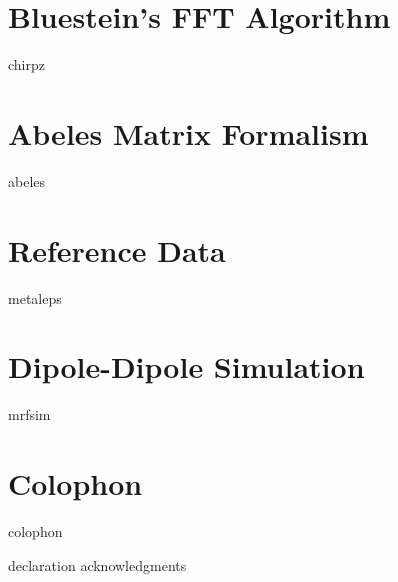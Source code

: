 \documentclass[12pt,a4paper,titlepage,onecolumn]{report}
\begin{document}
\section{Bluestein's FFT Algorithm}
{chirpz}
\section{Abeles Matrix Formalism}\label{ch:abeles}
{abeles}
\section{Reference Data}\label{ch:reference}
{metaleps}
\section{Dipole-Dipole Simulation}\label{sec:mrfsim}
{mrfsim}
\section{Colophon}
{colophon}




{declaration}
{acknowledgments}
\end{document}
